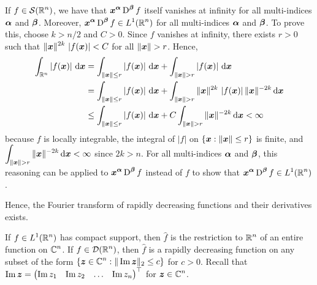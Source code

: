 If $\displaystyle f \in \mathcal{S}(\mathbb{R}^n)$, we have that
$\displaystyle {\bm{x}}^{{\bm{\alpha}}} \operatorname{D}^{{\bm{\beta}}} f$ itself
vanishes at infinity for all multi-indices ${\bm{\alpha}}$ and ${\bm{\beta}}$.
Moreover,
$\displaystyle {\bm{x}}^{{\bm{\alpha}}}\operatorname{D}^{{\bm{\beta}}} f \in L^1(\mathbb{R}^n)$
for all multi-indices ${\bm{\alpha}}$ and ${\bm{\beta}}$.  To prove this, choose
$k > n/2$ and $C>0$.  Since $f$ vanishes at infinity, there exists $r>0$
such that
$\displaystyle \|{\bm{x}}\|^{2k}\, \left| f({\bm{x}}) \right| < C$ for
all $\|{\bm{x}}\| > r$.  Hence,
\begin{align*}
\int_{\RR^n} \left| f(\VEC{x})\right| \dx{\VEC{x}} &=
\int_{\|\VEC{x}\|\leq r} \left| f(\VEC{x})\right| \dx{\VEC{x}} +
\int_{\|\VEC{x}\|> r} \left| f(\VEC{x})\right| \dx{\VEC{x}} \\
&= \int_{\|\VEC{x}\|\leq r} \left| f(\VEC{x})\right| \dx{\VEC{x}} +
\int_{\|\VEC{x}\|> r} \|\VEC{x}\|^{2k}\,\left| f(\VEC{x})\right|
\|\VEC{x}\|^{-2k} \dx{\VEC{x}} \\
&\leq \int_{\|\VEC{x}\|\leq r} \left| f(\VEC{x})\right| \dx{\VEC{x}} +
C \int_{\|\VEC{x}\|> r} \|\VEC{x}\|^{-2k} \dx{\VEC{x}} < \infty
\end{align*}
because $f$ is locally integrable, the integral of $|f|$ on
$\{ {\bm{x}} : \|{\bm{x}}\| \leq r \}$ is finite, and\\
$\displaystyle \int_{\|\VEC{x}\|> r} \|\VEC{x}\|^{-2k} \dx{\VEC{x}} < \infty$
since $2k >n$.  For all multi-indices ${\bm{\alpha}}$ and ${\bm{\beta}}$, this
reasoning can be applied to
$\displaystyle {\bm{x}}^{{\bm{\alpha}}} \operatorname{D}^{{\bm{\beta}}} f$ instead of $f$ to
show that
$\displaystyle {\bm{x}}^{{\bm{\alpha}}} \operatorname{D}^{{\bm{\beta}}} f \in L^1(\mathbb{R}^n)$.

Hence, the Fourier transform of rapidly decreasing functions and their
derivatives exists.

\begin{prop} \label{distr_four_f}
If $\displaystyle f \in L^1(\mathbb{R}^n)$ has compact support, then $\hat{f}$ is the
restriction to $\displaystyle \mathbb{R}^n$ of an entire function on
$\displaystyle \mathbb{C}^n$.  If
$\displaystyle f\in \mathcal{D}(\mathbb{R}^n)$, then $\hat{f}$ is a rapidly decreasing
function on any subset of the form
$\displaystyle \left\{ {\bm{z}}\in \mathbb{C}^n : \| \operatorname{Im} {\bm{z}} \|_2 \leq c \right\}$ 
for $c>0$.  Recall that
$\displaystyle \operatorname{Im} {\bm{z}} =
\begin{pmatrix} \operatorname{Im} z_1 & \operatorname{Im} z_2 & \ldots & \operatorname{Im} z_n \end{pmatrix}^\top$
for $\displaystyle {\bm{z}} \in \mathbb{C}^n$.
\end{prop}

